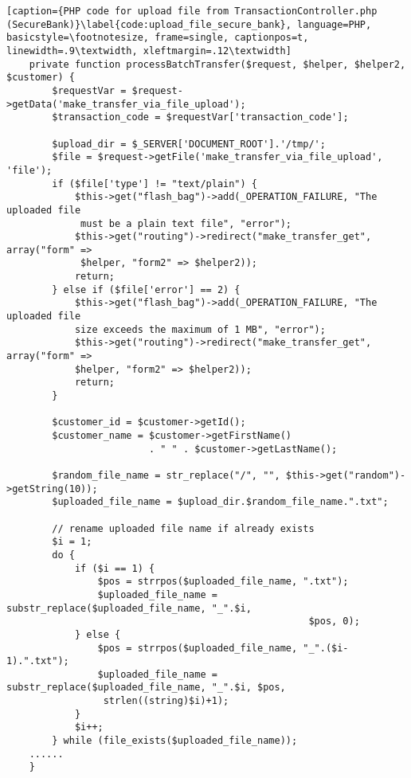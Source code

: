 \begin{lstlisting}[caption={PHP code for upload file from TransactionController.php (SecureBank)}\label{code:upload_file_secure_bank}, language=PHP, basicstyle=\footnotesize, frame=single, captionpos=t, linewidth=.9\textwidth, xleftmargin=.12\textwidth]
	private function processBatchTransfer($request, $helper, $helper2, $customer) {
	    $requestVar = $request->getData('make_transfer_via_file_upload');
        $transaction_code = $requestVar['transaction_code'];

        $upload_dir = $_SERVER['DOCUMENT_ROOT'].'/tmp/';
        $file = $request->getFile('make_transfer_via_file_upload', 'file');
        if ($file['type'] != "text/plain") {
            $this->get("flash_bag")->add(_OPERATION_FAILURE, "The uploaded file
             must be a plain text file", "error");
            $this->get("routing")->redirect("make_transfer_get", array("form" =>
             $helper, "form2" => $helper2));
            return;
        } else if ($file['error'] == 2) {
            $this->get("flash_bag")->add(_OPERATION_FAILURE, "The uploaded file
            size exceeds the maximum of 1 MB", "error");
            $this->get("routing")->redirect("make_transfer_get", array("form" =>
            $helper, "form2" => $helper2));
            return;
        }

        $customer_id = $customer->getId();
        $customer_name = $customer->getFirstName()
                         . " " . $customer->getLastName();

        $random_file_name = str_replace("/", "", $this->get("random")->getString(10));
        $uploaded_file_name = $upload_dir.$random_file_name.".txt";

        // rename uploaded file name if already exists
        $i = 1;
        do {
            if ($i == 1) {
                $pos = strrpos($uploaded_file_name, ".txt");
                $uploaded_file_name = substr_replace($uploaded_file_name, "_".$i,
                                                     $pos, 0);
            } else {
                $pos = strrpos($uploaded_file_name, "_".($i-1).".txt");
                $uploaded_file_name = substr_replace($uploaded_file_name, "_".$i, $pos,
                 strlen((string)$i)+1);
            }
            $i++;
        } while (file_exists($uploaded_file_name));
	......
	}
\end{lstlisting}
\clearpage
